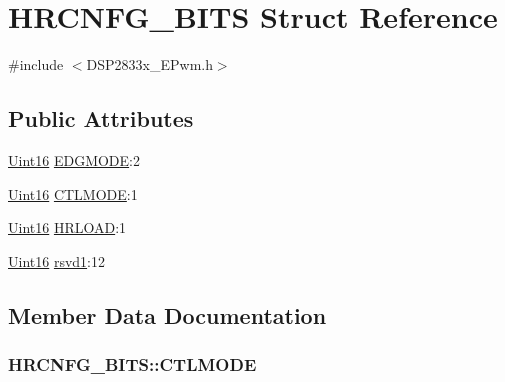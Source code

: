\hypertarget{struct_h_r_c_n_f_g___b_i_t_s}{}\section{H\+R\+C\+N\+F\+G\+\_\+\+B\+I\+T\+S Struct Reference}
\label{struct_h_r_c_n_f_g___b_i_t_s}


{\ttfamily \#include $<$D\+S\+P2833x\+\_\+\+E\+Pwm.\+h$>$}

\subsection*{Public Attributes}
\begin{DoxyCompactItemize}
\item 
\hyperlink{_d_s_p2833x___device_8h_a59a9f6be4562c327cbfb4f7e8e18f08b}{Uint16} \hyperlink{struct_h_r_c_n_f_g___b_i_t_s_aafcb04b041a163e53a3f69cc7cfe9985}{E\+D\+G\+M\+O\+D\+E}\+:2
\item 
\hyperlink{_d_s_p2833x___device_8h_a59a9f6be4562c327cbfb4f7e8e18f08b}{Uint16} \hyperlink{struct_h_r_c_n_f_g___b_i_t_s_a5ecce07d6bb9f16bfa5b7be85f3582d1}{C\+T\+L\+M\+O\+D\+E}\+:1
\item 
\hyperlink{_d_s_p2833x___device_8h_a59a9f6be4562c327cbfb4f7e8e18f08b}{Uint16} \hyperlink{struct_h_r_c_n_f_g___b_i_t_s_a0d3a586f81f42dbc6e0058e589df79d8}{H\+R\+L\+O\+A\+D}\+:1
\item 
\hyperlink{_d_s_p2833x___device_8h_a59a9f6be4562c327cbfb4f7e8e18f08b}{Uint16} \hyperlink{struct_h_r_c_n_f_g___b_i_t_s_ae9171039aace5808faba581f1dcd8a8e}{rsvd1}\+:12
\end{DoxyCompactItemize}


\subsection{Member Data Documentation}
\hypertarget{struct_h_r_c_n_f_g___b_i_t_s_a5ecce07d6bb9f16bfa5b7be85f3582d1}{}
\subsubsection[{C\+T\+L\+M\+O\+D\+E}]{ H\+R\+C\+N\+F\+G\+\_\+\+B\+I\+T\+S\+::\+C\+T\+L\+M\+O\+D\+E}\label{struct_h_r_c_n_f_g___b_i_t_s_a5ecce07d6bb9f16bfa5b7be85f3582d1}
\hypertarget{struct_h_r_c_n_f_g___b_i_t_s_aafcb04b041a163e53a3f69cc7cfe9985}{}
